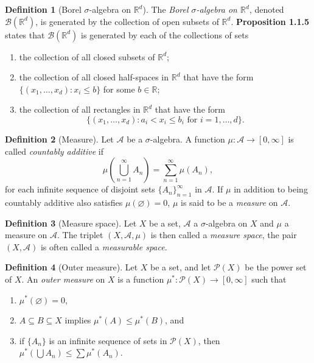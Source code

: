 \documentclass[12pt]{article}
\theoremstyle{definition}
\newtheorem{definition}{Definition}[section]
\newcommand{\real}{\mathbb{R}}   %
\newcommand{\algebra}{\mathscr{A}}
\begin{document}
\begin{definition}[Borel $\sigma$-algebra on $\real^d$]
    The \textit{Borel $\sigma$-algebra on $\real^d$}, denoted $\mathscr{B}(\real^d)$, is generated by the collection of open subsets of $\real^d$. \textbf{Proposition 1.1.5} states that $\mathscr{B}(\real^d)$ is generated by each of the collections of sets 
    \begin{enumerate}[label=(\alph*)]
        \item the collection of all closed subsets of $\real^d$;
        \item the collection of all closed half-spaces in $\real^d$ that have the form $\{(x_1,\dots,x_d):x_i\leq b\}$ for some $b\in\real$;
        \item the collection of all rectangles in $\real^d$ that have the form 
        \begin{equation*}
            \big\{(x_1,\dots,x_d):a_i<x_i\leq b_i\text{ for }i=1,\dots,d\big\}.
        \end{equation*}
    \end{enumerate}
\end{definition}
\begin{definition}[Measure]
    Let $\algebra$ be a $\sigma$-algebra. A function $\mu:\algebra\to[0,\infty]$ is called \textit{countably additive} if
    \begin{equation*}
        \mu\left(\bigcup_{n=1}^\infty A_n\right)=\sum_{n=1}^\infty \mu(A_n),
    \end{equation*}
    for each infinite sequence of disjoint sets $\{A_n\}_{n=1}^\infty$ in $\algebra$. If $\mu$ in addition to being countably additive also satisfies $\mu(\varnothing)=0$, $\mu$ is said to be a \textit{measure} on $\algebra$. 
\end{definition}
\begin{definition}[Measure space]
    Let $X$ be a set, $\algebra$ a $\sigma$-algebra on $X$ and $\mu$ a measure on $\algebra$. The triplet $(X,\algebra,\mu)$ is then called a \textit{measure space}, the pair $(X,\algebra)$ is often called a \textit{measurable space}.
\end{definition}
\begin{definition}[Outer measure]
    Let $X$ be a set, and let $\mathscr{P}(X)$ be the power set of $X$. An \textit{outer measure} on $X$ is a function $\mu^*:\mathscr{P}(X)\to [0,\infty]$ such that 
    \begin{enumerate}[label=(\alph*)]
        \item $\mu^*(\varnothing)=0$,
        \item $A\subseteq B\subseteq X$ implies $\mu^*(A)\leq \mu^*(B)$, and
        \item if $\{ A_n\}$ is an infinite sequence of sets in $\mathscr{P}(X)$, then $\mu^*\left(\bigcup A_n\right) \leq \sum \mu^*(A_n)$.
    \end{enumerate}
\end{definition}
\end{document}
